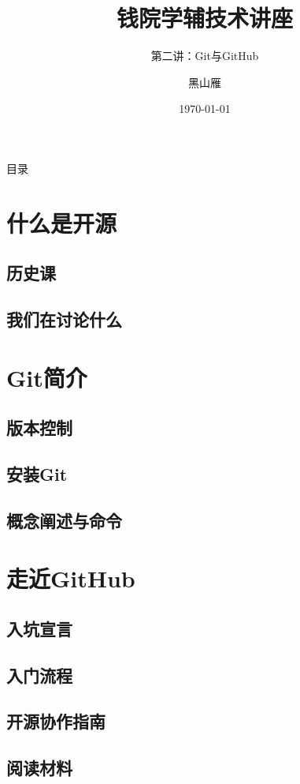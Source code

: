 \documentclass{beamer}
\title[Tech Lec]{钱院学辅技术讲座}
\subtitle{第二讲：Git与GitHub}
\author[xjtu-blacksmith]{黑山雁}
\institute[Xi'an Jiaotong University]
{
  西安交通大学
}
\date{\today}
\begin{document}
\begin{frame}
\maketitle
\end{frame}

\begin{frame}{目录}
    \tableofcontents
\end{frame}

\section{什么是开源}
\subsection{历史课}
\subsection{我们在讨论什么}

\section{Git简介}
\subsection{版本控制}
\subsection{安装Git}
\subsection{概念阐述与命令}

\section{走近GitHub}
\subsection{入坑宣言}
\subsection{入门流程}
\subsection{开源协作指南}
\subsection{阅读材料}
\end{document}
